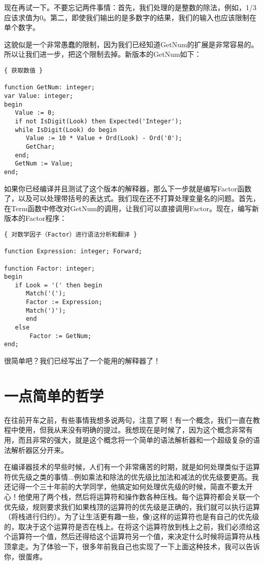 现在再试一下。不要忘记两件事情：首先，我们处理的是整数的除法，例如，1/3应该求值为0。第二，即使我们输出的是多数字的结果，我们的输入也应该限制在单个数字。

这貌似是一个非常愚蠢的限制，因为我们已经知道GetNum的扩展是非常容易的。所以让我们进一步，把这个限制去掉。新版本的GetNum如下：

\begin{verbatim}
{ 获取数值 }

function GetNum: integer;
var Value: integer;
begin
   Value := 0;
   if not IsDigit(Look) then Expected('Integer');
   while IsDigit(Look) do begin
      Value := 10 * Value + Ord(Look) - Ord('0');
      GetChar;
   end;
   GetNum := Value;
end;
\end{verbatim}

如果你已经编译并且测试了这个版本的解释器，那么下一步就是编写Factor函数了，以及可以处理带括号的表达式。我们现在还不打算处理变量名的问题。首先，在Term函数中修改对GetNum的调用，让我们可以直接调用Factor。现在，编写新版本的Factor程序：

\begin{verbatim}
{ 对数学因子（Factor）进行语法分析和翻译 }

function Expression: integer; Forward;

function Factor: integer;
begin
   if Look = '(' then begin
      Match('(');
      Factor := Expression;
      Match(')');
      end
   else
       Factor := GetNum;
end;
\end{verbatim}

很简单吧？我们已经写出了一个能用的解释器了！

\section{一点简单的哲学}

在往前开车之前，有些事情我想多说两句，注意了啊！有一个概念，我们一直在教程中使用，但我从来没有明确的提过。我想现在是时候了，因为这个概念非常有用，而且非常的强大，就是这个概念将一个简单的语法解析器和一个超级复杂的语法解析器区分开来。

在编译器技术的早些时候，人们有一个非常痛苦的时期，就是如何处理类似于运算符优先级之类的事情...例如乘法和除法的优先级比加法和减法的优先级要更高。我还记得一个三十年前的大学同学，他搞定如何处理优先级的时候，简直不要太开心！他使用了两个栈，然后将运算符和操作数各种压栈。每个运算符都会关联一个优先级，规则要求我们如果栈顶的运算符的优先级是正确的，我们就可以执行运算（将栈进行归约）。为了让生活更有趣一些，像)这样的运算符也是有自己的优先级的，取决于这个运算符是否在栈上。在将这个运算符放到栈上之前，我们必须给这个运算符一个值，然后还得给这个运算符另一个值，来决定什么时候将运算符从栈顶拿走。为了体验一下，很多年前我自己也实现了一下上面这种技术，我可以告诉你，很蛋疼。

